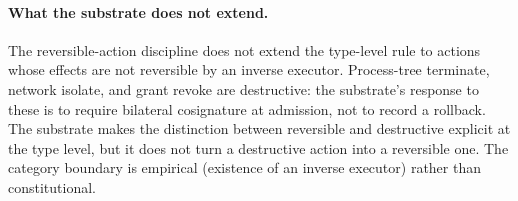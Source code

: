 \paragraph{What the substrate does not extend.}
The reversible-action discipline does not extend the type-level rule
to actions whose effects are not reversible by an inverse executor.
Process-tree terminate, network isolate, and grant revoke are
destructive: the substrate's response to these is to require bilateral
cosignature at admission, not to record a rollback. The substrate makes
the distinction between reversible and destructive explicit at the type
level, but it does not turn a destructive action into a reversible one.
The category boundary is empirical (existence of an inverse executor)
rather than constitutional.
